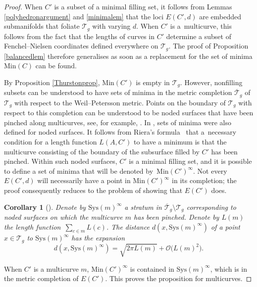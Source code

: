 \documentclass[pdftex]{sigma}
\numberwithin{equation}{section}
\newtheorem{Corollary}[Theorem]{Corollary}
\begin{document}
\begin{proof}
When $C'$ is a subset of a minimal filling set, it follows from Lemmas \ref{polyhedronargument} and \ref{minimalem} that the loci $E(C',d)$ are embedded submanifolds that foliate $\mathcal{T}_{g}$ with varying $d$. When $C'$ is a~multicurve, this follows from the fact that the lengths of curves in $C'$ determine a subset of Fenchel--Nielsen coordinates defined everywhere on $\mathcal{T}_{g}$. The proof of Proposition \ref{balancedlem} therefore generalises as soon as a replacement for the set of minima $\mathrm{Min}(C)$ can be found.

By Proposition \ref{Thurstonprop}, $\mathrm{Min}(C')$ is empty in $\mathcal{T}_{g}$. However, nonfilling subsets can be understood to have sets of minima in the metric completion $\overline{\mathcal{T}}_{g}$ of $\mathcal{T}_{g}$ with respect to the Weil--Petersson metric. Points on the boundary of $\mathcal{T}_{g}$ with respect to this completion can be understood to be noded surfaces that have been pinched along multicurves, see, for example, \cite{wolpert2005}. In \cite{SchmutzMorse}, sets of minima were also defined for noded surfaces. It follows from Riera's formula~\cite{Riera} that a~necessary condition for a length function $L(A, C')$ to have a minimum is that the multicurve consisting of the boundary of the subsurface filled by $C'$ has been pinched. Within such noded surfaces, $C'$ is a minimal filling set, and it is possible to define a set of minima that will be denoted by~$\mathrm{Min}(C')^{\infty}$. Not every $E(C',d)$ will necessarily have a point in $\mathrm{Min}(C')^{\infty}$ in its completion; the proof consequently reduces to the problem of showing that $E(C')$ does.

\begin{Corollary}[{\cite[Corollary 21]{wolpert2005}}]
\label{wolcor}
Denote by $\mathrm{Sys}(m)^{\infty}$ a stratum in $\overline{\mathcal{T}}_{g}\setminus \mathcal{T}_{g}$ corresponding to noded surfaces on which the multicurve $m$ has been pinched. Denote by $L(m)$ the length function~$\sum_{c\in m}L(c)$.
The distance $d(x, \mathrm{Sys}(m)^{\infty})$ of a point $x\in \mathcal{T}_{g}$ to $\mathrm{Sys}(m)^{\infty}$ has the expansion
\begin{equation*}
d(x, \mathrm{Sys}(m)^{\infty})=\sqrt{2\pi L(m)}+\mathcal{O}\bigl(L(m)^{2}\bigr).
\end{equation*}
\end{Corollary}


When $C'$ is a multicurve $m$, $\mathrm{Min}(C')^{\infty}$ is contained in $\mathrm{Sys}(m)^{\infty}$, which is in the metric completion of $E(C')$. This proves the proposition for multicurves.


\end{proof}
\end{document}

